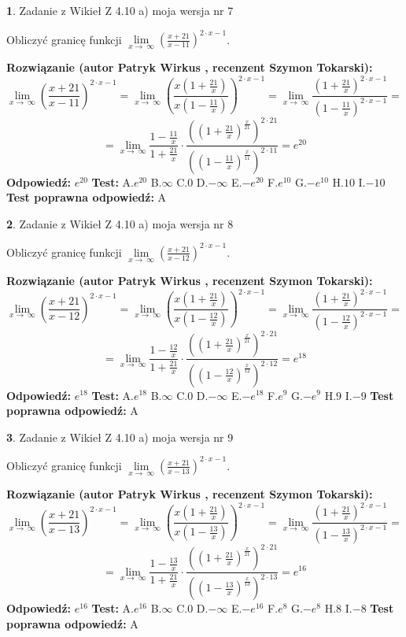 \documentclass[12pt, a4paper]{article}
\theoremstyle{definition} %
\newtheorem{zad}{}
\newcommand{\zadStart}[1]{\begin{zad}#1\newline}
\newcommand{\zadStop}{\end{zad}}
\newcommand{\rozwStart}[2]{\noindent \textbf{Rozwiązanie (autor #1 , recenzent #2): }\newline}
\newcommand{\rozwStop}{\newline}
\newcommand{\odpStart}{\noindent \textbf{Odpowiedź:}\newline}
\newcommand{\odpStop}{\newline}
\newcommand{\testStart}{\noindent \textbf{Test:}\newline}
\newcommand{\testStop}{\newline}
\newcommand{\kluczStart}{\noindent \textbf{Test poprawna odpowiedź:}\newline}
\newcommand{\kluczStop}{\newline}
\begin{document}
\zadStart{Zadanie z Wikieł Z 4.10 a) moja wersja nr 7}

Obliczyć granicę funkcji  $\lim\limits_{x\to\ \infty}(\frac{x+21}{x-11})^{2\cdot x-1}$.
\zadStop
\rozwStart{Patryk Wirkus}{Szymon Tokarski}
$$\lim\limits_{x\to\ \infty}(\frac{x+21}{x-11})^{2\cdot x-1} = \lim\limits_{x\to\ \infty}(\frac{x(1+\frac{21}{x})}{x(1-\frac{11}{x})})^{2\cdot x-1}=\lim\limits_{x\to\ \infty}\frac{(1+\frac{21}{x})^{2\cdot x-1}}{(1-\frac{11}{x})^{2\cdot x-1}}=$$
$$=\lim\limits_{x\to\ \infty}\frac{1-\frac{11}{x}}{1+\frac{21}{x}}\cdot\frac{((1+\frac{21}{x})^{\frac{x}{21}})^{2\cdot21}}{((1-\frac{11}{x})^{\frac{x}{11}})^{2\cdot11}}=e^{20}$$
\rozwStop
\odpStart
$e^{20}$
\odpStop
\testStart
A.$e^{20}$ B.$\infty$ C.$0$ D.$-\infty$ E.$-e^{20}$
F.$e^{10}$ G.$-e^{10}$
H.$10$
I.$-10$
\testStop
\kluczStart
A
\kluczStop



\zadStart{Zadanie z Wikieł Z 4.10 a) moja wersja nr 8}

Obliczyć granicę funkcji  $\lim\limits_{x\to\ \infty}(\frac{x+21}{x-12})^{2\cdot x-1}$.
\zadStop
\rozwStart{Patryk Wirkus}{Szymon Tokarski}
$$\lim\limits_{x\to\ \infty}(\frac{x+21}{x-12})^{2\cdot x-1} = \lim\limits_{x\to\ \infty}(\frac{x(1+\frac{21}{x})}{x(1-\frac{12}{x})})^{2\cdot x-1}=\lim\limits_{x\to\ \infty}\frac{(1+\frac{21}{x})^{2\cdot x-1}}{(1-\frac{12}{x})^{2\cdot x-1}}=$$
$$=\lim\limits_{x\to\ \infty}\frac{1-\frac{12}{x}}{1+\frac{21}{x}}\cdot\frac{((1+\frac{21}{x})^{\frac{x}{21}})^{2\cdot21}}{((1-\frac{12}{x})^{\frac{x}{12}})^{2\cdot12}}=e^{18}$$
\rozwStop
\odpStart
$e^{18}$
\odpStop
\testStart
A.$e^{18}$ B.$\infty$ C.$0$ D.$-\infty$ E.$-e^{18}$
F.$e^{9}$ G.$-e^{9}$
H.$9$
I.$-9$
\testStop
\kluczStart
A
\kluczStop



\zadStart{Zadanie z Wikieł Z 4.10 a) moja wersja nr 9}

Obliczyć granicę funkcji  $\lim\limits_{x\to\ \infty}(\frac{x+21}{x-13})^{2\cdot x-1}$.
\zadStop
\rozwStart{Patryk Wirkus}{Szymon Tokarski}
$$\lim\limits_{x\to\ \infty}(\frac{x+21}{x-13})^{2\cdot x-1} = \lim\limits_{x\to\ \infty}(\frac{x(1+\frac{21}{x})}{x(1-\frac{13}{x})})^{2\cdot x-1}=\lim\limits_{x\to\ \infty}\frac{(1+\frac{21}{x})^{2\cdot x-1}}{(1-\frac{13}{x})^{2\cdot x-1}}=$$
$$=\lim\limits_{x\to\ \infty}\frac{1-\frac{13}{x}}{1+\frac{21}{x}}\cdot\frac{((1+\frac{21}{x})^{\frac{x}{21}})^{2\cdot21}}{((1-\frac{13}{x})^{\frac{x}{13}})^{2\cdot13}}=e^{16}$$
\rozwStop
\odpStart
$e^{16}$
\odpStop
\testStart
A.$e^{16}$ B.$\infty$ C.$0$ D.$-\infty$ E.$-e^{16}$
F.$e^{8}$ G.$-e^{8}$
H.$8$
I.$-8$
\testStop
\kluczStart
A
\kluczStop
\end{document}
